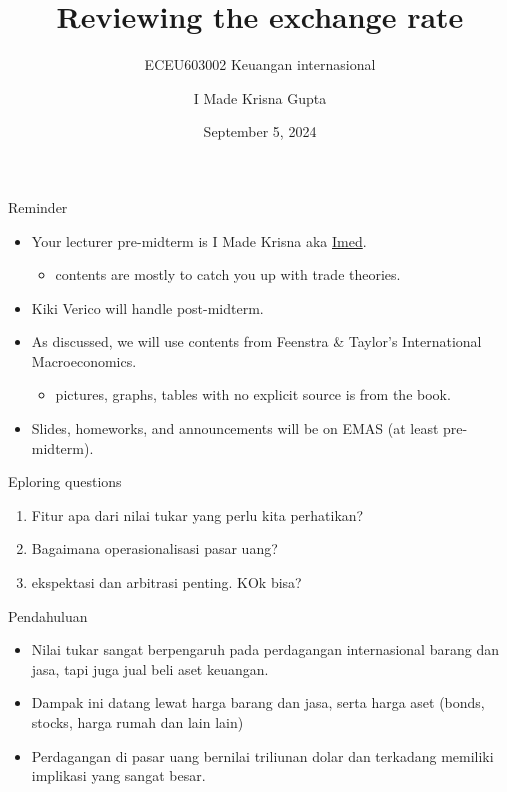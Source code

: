 \documentclass[
  ignorenonframetext,
]{beamer}
\title{Reviewing the exchange rate}
\subtitle{ECEU603002 Keuangan internasional}
\author{I Made Krisna Gupta}
\date{September 5, 2024}
\providecommand{\tightlist}{%
  \setlength{\itemsep}{0pt}\setlength{\parskip}{0pt}}\usepackage{longtable,booktabs,array}
\begin{document}
\frame{\titlepage}


\begin{frame}{Reminder}
\label{reminder}
\begin{itemize}
\item
  Your lecturer pre-midterm is I Made Krisna aka
  \href{https://krisna.or.id}{Imed}.

  \begin{itemize}
  \tightlist
  \item
    contents are mostly to catch you up with trade theories.
  \end{itemize}
\item
  Kiki Verico will handle post-midterm.
\item
  As discussed, we will use contents from Feenstra \& Taylor's
  International Macroeconomics.

  \begin{itemize}
  \tightlist
  \item
    pictures, graphs, tables with no explicit source is from the book.
  \end{itemize}
\item
  Slides, homeworks, and announcements will be on EMAS (at least
  pre-midterm).
\end{itemize}
\end{frame}

\begin{frame}{Eploring questions}
\label{eploring-questions}
\begin{enumerate}
\tightlist
\item
  Fitur apa dari nilai tukar yang perlu kita perhatikan?
\item
  Bagaimana operasionalisasi pasar uang?
\item
  ekspektasi dan arbitrasi penting. KOk bisa?
\end{enumerate}
\end{frame}

\begin{frame}{Pendahuluan}
\label{pendahuluan}
\begin{itemize}
\item
  Nilai tukar sangat berpengaruh pada perdagangan internasional barang
  dan jasa, tapi juga jual beli aset keuangan.
\item
  Dampak ini datang lewat harga barang dan jasa, serta harga aset
  (bonds, stocks, harga rumah dan lain lain)
\item
  Perdagangan di pasar uang bernilai triliunan dolar dan terkadang
  memiliki implikasi yang sangat besar.
\end{itemize}
\end{frame}
\end{document}
